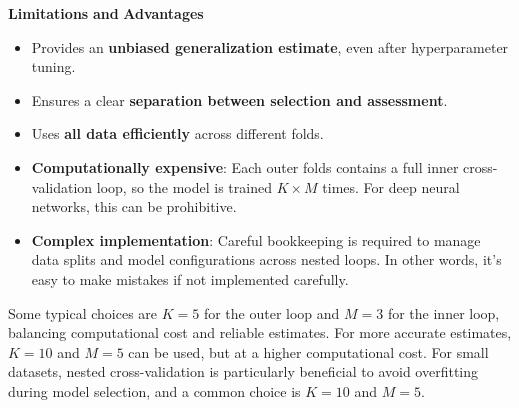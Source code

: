 \highspace
\begin{flushleft}
    \textcolor{Red2}{ \textbf{Limitations}} \textbf{and} \textcolor{Green3}{ \textbf{Advantages}}
\end{flushleft}
\begin{itemize}
    \item[\textcolor{Green3}{\faIcon{check}}] Provides an \textbf{unbiased generalization estimate}, even after hyperparameter tuning.
    \item[\textcolor{Green3}{\faIcon{check}}] Ensures a clear \textbf{separation between selection and assessment}.
    \item[\textcolor{Green3}{\faIcon{check}}] Uses \textbf{all data efficiently} across different folds.
    \item[\textcolor{Red2}{\faIcon{times}}] \textbf{Computationally expensive}: Each outer folds contains a full inner cross-validation loop, so the model is trained $K \times M$ times. For deep neural networks, this can be prohibitive.
    \item[\textcolor{Red2}{\faIcon{times}}] \textbf{Complex implementation}: Careful bookkeeping is required to manage data splits and model configurations across nested loops. In other words, it's easy to make mistakes if not implemented carefully.
\end{itemize}
Some typical choices are $K=5$ for the outer loop and $M=3$ for the inner loop, balancing computational cost and reliable estimates. For more accurate estimates, $K=10$ and $M=5$ can be used, but at a higher computational cost. For small datasets, nested cross-validation is particularly beneficial to avoid overfitting during model selection, and a common choice is $K=10$ and $M=5$.
